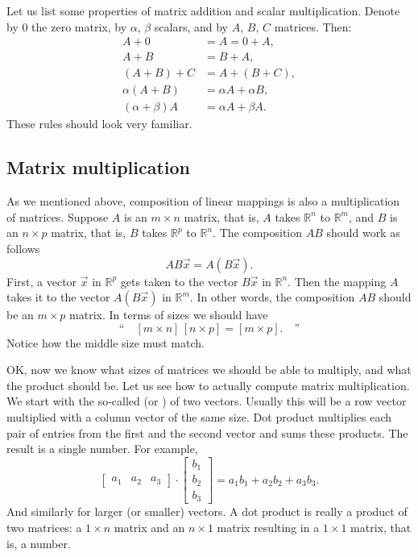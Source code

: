 Let us list some properties of matrix addition and scalar multiplication.
Denote by $0$ the zero matrix, by
$\alpha$, $\beta$ scalars, and by $A$, $B$, $C$ matrices.  Then:
\begin{align*}
A + 0 & = A = 0 + A , \\
A + B & = B + A , \\
(A + B) + C & = A + (B + C) , \\
\alpha(A+B) & = \alpha A+\alpha B, \\
(\alpha+\beta)A & = \alpha A + \beta A.
\end{align*}
These rules should look very familiar.

\subsection{Matrix multiplication}

As we mentioned above, composition of linear mappings is also a
multiplication of matrices.  Suppose $A$ is an $m \times n$ matrix,
that is, $A$ takes
${\mathbb R}^n$ to
${\mathbb R}^m$,
and $B$ is an $n \times p$ matrix, that is, $B$ takes
${\mathbb R}^p$ to
${\mathbb R}^n$.  The composition $AB$ should work as follows
\begin{equation*}
AB\vec{x} = A(B\vec{x}) .
\end{equation*}
First, a vector $\vec{x}$ in ${\mathbb R}^p$ gets taken to 
the vector $B\vec{x}$ in
${\mathbb R}^n$.  Then the mapping $A$ takes it to the vector $A(B\vec{x})$
in ${\mathbb R}^m$.  In other words, the composition $AB$ should be an $m
\times p$ matrix.  In terms of sizes we should have
\begin{equation*}
\text{``} \quad
[ m \times n ]
\,
[ n \times p ]
=
[ m \times p ] . \quad \text{''}
\end{equation*}
Notice how the middle size must match.

OK, now we know what sizes of matrices we should be able to multiply,
and what the product should be.
Let us see how to actually compute matrix multiplication.
We start with the so-called
\emph{} (or \emph{}) of two vectors.
Usually this will be a row vector multiplied
with a column vector of the same size.  Dot product multiplies
each pair of entries from the first and the second vector and sums these
products.  The result is a single number.
For example,
\begin{equation*}
\begin{bmatrix}
a_1 & a_2 & a_3
\end{bmatrix}
\cdot
\begin{bmatrix}
b_1 \\
b_2 \\
b_3
\end{bmatrix}
= a_1 b_1 + a_2 b_2 + a_3 b_3 .
\end{equation*}
And similarly for larger (or smaller) vectors.
A dot product is really a product of two matrices: a $1 \times n$ matrix
and an $n \times 1$ matrix resulting in a $1 \times 1$ matrix, that is, a
number.

